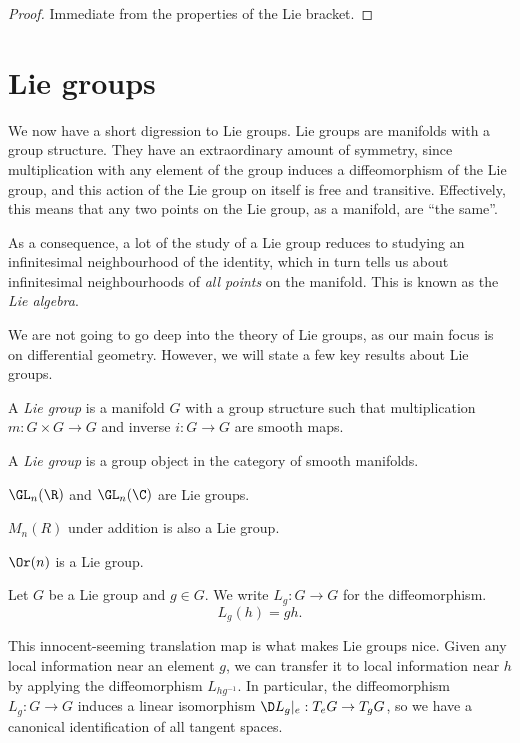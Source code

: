 \documentclass[a4paper]{article}
\begin{document}
\begin{proof}
  Immediate from the properties of the Lie bracket.
\end{proof}

\section{Lie groups}
We now have a short digression to Lie groups. Lie groups are manifolds with a group structure. They have an extraordinary amount of symmetry, since multiplication with any element of the group induces a diffeomorphism of the Lie group, and this action of the Lie group on itself is free and transitive. Effectively, this means that any two points on the Lie group, as a manifold, are ``the same''.

As a consequence, a lot of the study of a Lie group reduces to studying an infinitesimal neighbourhood of the identity, which in turn tells us about infinitesimal neighbourhoods of \emph{all points} on the manifold. This is known as the \emph{Lie algebra}.

We are not going to go deep into the theory of Lie groups, as our main focus is on differential geometry. However, we will state a few key results about Lie groups.

\begin{defi}
  A \emph{Lie group} is a manifold $G$ with a group structure such that multiplication $m: G \times G \to G$ and inverse $i: G \to G$ are smooth maps.
\end{defi}

\begin{own}
  \begin{defi}
    A \emph{Lie group} is a group object in the category of smooth manifolds.
  \end{defi}
\end{own}

\begin{eg}
  $\GL_n(\R)$ and $\GL_n(\C)$ are Lie groups.
\end{eg}

\begin{eg}
  $M_n(R)$ under addition is also a Lie group.
\end{eg}

\begin{eg}
  $\Or(n)$ is a Lie group.
\end{eg}

\begin{notation}
  Let $G$ be a Lie group and $g \in G$. We write $L_g: G \to G$ for the diffeomorphism.
  \[
    L_g(h) = gh.
  \]
\end{notation}
This innocent-seeming translation map is what makes Lie groups nice. Given any local information near an element $g$, we can transfer it to local information near $h$ by applying the diffeomorphism $L_{hg^{-1}}$. In particular, the diffeomorphism $L_g: G \to G$ induces a linear isomorphism $\D L_g|_e : T_e G \to T_g G$, so we have a canonical identification of all tangent spaces.
\end{document}
